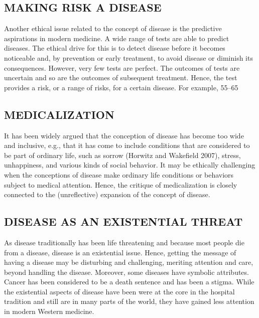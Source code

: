 \documentclass[conference]{IEEEtran}
\begin{document}
\subsection{MAKING RISK A DISEASE}
Another ethical issue related to the concept of disease is the predictive aspirations in modern medicine. A wide range of tests are able to predict diseases. The ethical drive for this is to detect disease before it becomes noticeable and, by prevention or early treatment, to avoid disease or diminish its consequences. However, very few tests are perfect. The outcomes of tests are uncertain and so are the outcomes of subsequent treatment. Hence, the test provides a risk, or a range of risks, for a certain disease. For example, 55–65 %
\subsection{MEDICALIZATION}\label{SCM}
It has been widely argued that the conception of disease has become too wide and inclusive, e.g., that it has come to include conditions that are considered to be part of ordinary life, such as sorrow (Horwitz and Wakeﬁeld 2007), stress, unhappiness, and various kinds of social behavior. It may be ethically challenging when the conceptions of disease make ordinary life conditions or behaviors subject to medical attention. Hence, the critique of medicalization is closely connected to the (unreﬂective) expansion of the concept of disease.
\subsection{DISEASE AS AN EXISTENTIAL THREAT}
As disease traditionally has been life threatening and because most people die from a disease, disease is an existential issue. Hence, getting the message of having a disease may be disturbing and challenging, meriting \cite{b7}attention and care, beyond handling the disease. Moreover, some diseases have symbolic attributes. Cancer has been considered to be a death sentence and has been a stigma. While the existential aspects of disease have been were at the core in the hospital tradition and still are in many parts of the world, they have gained less attention in modern Western medicine.
\end{document}
